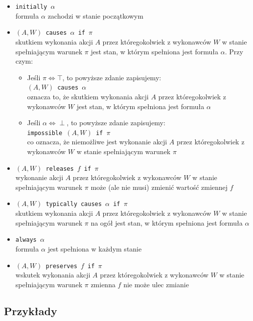 \documentclass{article}
\begin{document}
\begin{itemize}
\item {\large\texttt{initially $\alpha$}}\\
formuła $\alpha$ zachodzi w stanie początkowym
\item {\large\texttt{$(A,W)$ causes $\alpha$ if $\pi$}}\\
skutkiem wykonania akcji $A$ przez któregokolwiek z wykonawców $W$ w stanie spełniającym warunek $\pi$ jest stan, w którym spełniona jest formuła $\alpha$. Przy czym:
\begin{itemize}
    \item Jeśli $\pi \Leftrightarrow \top$, to powyższe zdanie zapisujemy:\\
    {\large\texttt{$(A,W)$ causes $\alpha$ }}\\
    oznacza to, że skutkiem wykonania akcji $A$ przez któregokolwiek z wykonawców $W$ jest stan, w którym spełniona jest formuła $\alpha$
    \item Jeśli $\alpha \Leftrightarrow \perp$, to powyższe zdanie zapisujemy:\\
    {\large\texttt{impossible $(A,W)$ if $\pi$}}\\
    co oznacza, że niemożliwe jest wykonanie akcji $A$ przez któregokolwiek z wykonawców $W$ w stanie spełniającym warunek $\pi$
\end{itemize}
\item {\large\texttt{$(A,W)$ releases $f$ if $\pi$}}\\
wykonanie akcji $A$ przez któregokolwiek z wykonawców $W$ w stanie spełniającym warunek $\pi$ może (ale nie musi) zmienić wartość zmiennej $f$
\item {\large\texttt{$(A,W)$ typically causes $\alpha$ if $\pi$}}\\
skutkiem wykonania akcji $A$ przez któregokolwiek z wykonawców $W$ w stanie spełniającym warunek $\pi$ na ogół jest stan, w którym spełniona jest formuła $\alpha$
\item {\large\texttt{always $\alpha$}}\\
formuła $\alpha$ jest spełniona w każdym stanie
\item {\large\texttt{$(A,W)$ preserves $f$ if $\pi$}}\\
wskutek wykonania akcji $A$ przez któregokolwiek z wykonawców $W$ w stanie spełniającym warunek $\pi$ zmienna $f$ nie może ulec zmianie
\end{itemize}

\subsection{Przykłady} 
\end{document}
